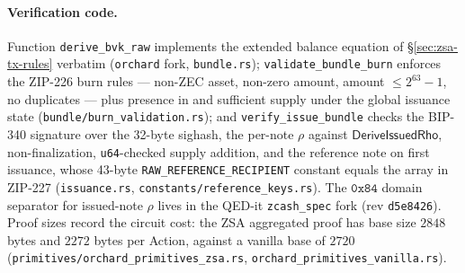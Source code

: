 \documentclass[11pt,a4paper]{article}
\theoremstyle{definition}
\begin{document}
\paragraph{Verification code.} Function \texttt{derive\_bvk\_raw} implements
the extended balance equation of \S\ref{sec:zsa-tx-rules} verbatim
(\texttt{orchard} fork, \texttt{bundle.rs}); \texttt{validate\_bundle\_burn}
enforces the ZIP-226 burn rules --- non-ZEC asset, non-zero amount, amount
$\leq 2^{63} - 1$, no duplicates --- plus presence in and sufficient supply
under the global issuance state (\texttt{bundle/burn\_validation.rs}); and
\texttt{verify\_issue\_bundle} checks the BIP-340 signature over the 32-byte
sighash, the per-note $\rho$ against
$\mathsf{DeriveIssuedRho}$, non-finalization, \texttt{u64}-checked supply
addition, and the reference note on first issuance, whose 43-byte
\texttt{RAW\_REFERENCE\_RECIPIENT} constant equals the array in ZIP-227
(\texttt{issuance.rs}, \texttt{constants/reference\_keys.rs}). The
$\mathtt{0x84}$ domain separator for issued-note $\rho$ lives in the QED-it
\texttt{zcash\_spec} fork (rev \texttt{d5e8426}). Proof sizes record the
circuit cost: the ZSA aggregated proof has base size $2848$ bytes and
$2272$ bytes per Action, against a vanilla base of $2720$
(\texttt{primitives/orchard\_primitives\_zsa.rs},
\texttt{orchard\_primitives\_vanilla.rs}).
\end{document}
